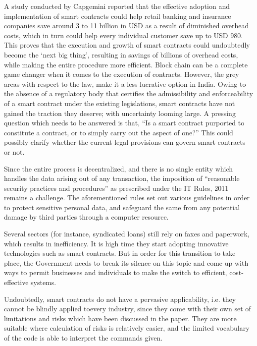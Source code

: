 \begin{multicols}{2}
\noi
A study conducted by Capgemini reported that the effective adoption and implementation of
smart contracts could help retail banking and insurance companies save around 3 to 11 billion
in USD as a result of diminished overhead costs, which in turn could help every individual
customer save up to USD 980. This proves that the execution and growth of smart contracts
could undoubtedly become the ‘next big thing’, resulting in savings of billions of overhead
costs, while making the entire procedure more efficient. Block chain can be a complete game
changer when it comes to the execution of contracts. However, the grey areas with respect to
the law, make it a less lucrative option in India. Owing to the absence of a regulatory body
that certifies the admissibility and enforceability of a smart contract under the existing
legislations, smart contracts have not gained the traction they deserve; with uncertainty looming large. A pressing question which needs to be answered is that, “Is a smart contract
purported to constitute a contract, or to simply carry out the aspect of one?” This could
possibly clarify whether the current legal provisions can govern smart contracts or not. 

\noi
Since the entire process is decentralized, and there is no single entity which handles the data
arising out of any transaction, the imposition of “reasonable security practices and
procedures” as prescribed under the IT Rules, 2011 remains a challenge. The aforementioned
rules set out various guidelines in order to protect sensitive personal data, and safeguard the
same from any potential damage by third parties through a computer resource. 

\noi
Several sectors (for instance, syndicated loans) still rely on faxes and paperwork, which
results in inefficiency. It is high time they start adopting innovative technologies such as
smart contracts. But in order for this transition to take place, the Government needs to break
its silence on this topic and come up with ways to permit businesses and individuals to make
the switch to efficient, cost-effective systems.

\noi
Undoubtedly, smart contracts do not have a pervasive applicability, i.e. they cannot be
blindly applied to\break every industry, since they come with their own set of limitations and risks
which have been discussed in the paper. They are more suitable where calculation of risks is
relatively easier, and the limited vocabulary of the code is able to interpret the commands
given. 


\end{multicols}
